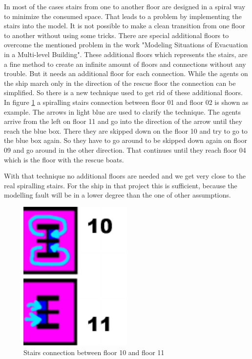 \documentclass[11pt]{article}
\begin{document}
In most of the cases stairs from one to another floor are designed in a spiral way to minimize the consumed space. That leads to a problem by implementing the stairs into the model. It is not possible to make a clean transition from one floor to another without using some tricks.
\newline
There are special additional floors to overcome the mentioned problem in the work "Modeling Situations of Evacuation in a Multi-level Building"\cite{Building}. These additional floors which represents the stairs, are a fine method to create an infinite amount of floors and connections without any trouble. But it needs an additional floor for each connection.
\newline
While the agents on the ship march only in the direction of the rescue floor the connection can be simplified. So there is a new technique used to get rid of these additional floors.
\newline
In figure \ref{Decktwostairs} a spiralling stairs connection between floor 01 and floor 02 is shown as example. The arrows in light blue are used to clarify the technique.
\newline
The agents arrive from the left on floor 11 and go into the direction of the arrow until they reach the blue box. There they are skipped down on  the floor 10 and try to go to the blue box again. So they have to go around to be skipped down again on floor 09 and go around in the other direction. That continues until they reach floor 04 which is the floor with the rescue boats.

With that technique no additional floors are needed and we get very close to the real spiralling stairs. For the ship in that project this is sufficient, because the modelling fault will be in a lower degree than the one of other assumptions.

\begin{figure}[H]
\centering
{\begin{minipage}[t]{7.4cm}
\includegraphics [width=0.5\textwidth]{pics/Decktwostairs.pdf}
\caption{Stairs connection between floor 10 and floor 11}
\label{Decktwostairs}
\end{minipage}}
\end{figure}
\end{document}
